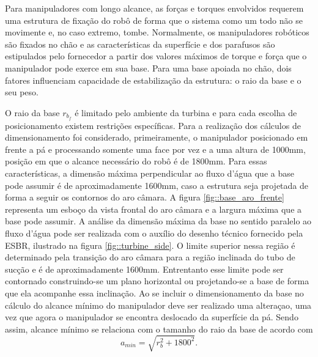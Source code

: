 Para manipuladores com longo alcance, as forças e torques envolvidos requerem
uma estrutura de fixação do robô de forma que o sistema como um todo não se
movimente e, no caso extremo, tombe. Normalmente, os manipuladores robóticos são
fixados no chão e as características da superfície e dos parafusos são
estipulados pelo fornecedor a partir dos valores máximos de torque e força que o
manipulador pode exerce em sua base. Para uma base apoiada no chão, dois
fatores influenciam capacidade de estabilização da estrutura: o raio da base e o seu
peso.

O raio da base $r_{b_f}$ é limitado pelo ambiente da turbina e para cada escolha
de posicionamento existem restrições específicas. 
Para a realização dos cálculos de dimensionamento foi considerado,
primeiramente, o manipulador posicionado em frente a pá e processando somente uma face por vez
e a uma altura de 1000mm, posição em que o alcance necessário do robô é de
1800mm. Para essas características, a dimensão máxima perpendicular ao fluxo d'água que a base 
pode assumir é de aproximadamente 1600mm, caso a estrutura seja
 projetada de forma a seguir os contornos do aro câmara.
A figura \ref{fig::base_aro_frente} 
representa um esboço da vista frontal do aro câmara e a largura máxima que a
base pode assumir. A análise da dimensão máxima da base no sentido paralelo ao
fluxo d'água pode ser realizada com o auxílio do desenho técnico fornecido pela
ESBR, ilustrado na figura \ref{fig::turbine_side}. 
O limite superior nessa
região é determinado pela transição do aro câmara para a região inclinada do
tubo de sucção e é de aproximadamente 1600mm. Entrentanto esse limite pode ser
contornado construindo-se um plano horizontal ou projetando-se a base de forma que ela acompanhe essa
inclinação. Ao se incluir o dimensionamento da base no cálculo do alcance mínimo
do manipulador deve ser realizado uma alteraçao, uma vez que agora o manipulador
se encontra deslocado da superfície da pá. Sendo assim, alcance mínimo se
relaciona com o tamanho do raio da base de acordo com
$$a_{min}=\sqrt{r_b^2+1800^2}.$$

